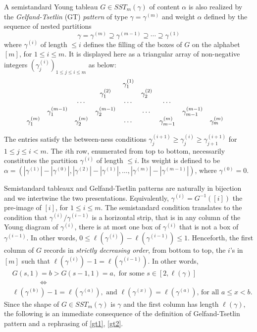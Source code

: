 \documentclass[reqno]{amsart}
\theoremstyle{tplain}
\begin{document}
{A semistandard Young tableau $G\in SST_m(\gamma)$ of content $\alpha$ is also realized by the \emph{Gelfand-Tsetlin} (GT) \emph{pattern} of type $\gamma=\gamma^{(m)}$ and weight $\alpha$ \cite{gt50} defined by the sequence of nested partitions
$$\gamma = \gamma^{(m)}\supseteq  \gamma^{(m-1)}\supseteq\cdots\supseteq \gamma^{(1)}$$
where $ \gamma^{(i)}$ of length $\le i$ defines  the filling of the boxes of $G$ on the alphabet $[m]$, for  $1\le i\le m$.
It is
displayed here as a triangular array of
non-negative integers $(\gamma_j^{(i)})_{1\leq j\leq i\leq m}$
as below:
\begin{equation}\label{gtpattern}
\begin{array}{cccccccccccccccccc}
&&&&\gamma_1^{(1)}\cr
&&&\gamma_1^{(2)}&&\gamma_2^{(2)}\cr
&&\cdots&&\cdots&&\cdots\cr
&\gamma_1^{(m-1)}&&\gamma_2^{(m-1)}&&\cdots&&\gamma_{m-1}^{(m-1)}\cr
\gamma_1^{(m)}&&\gamma_2^{(m)}&&\cdots&&\gamma_{m-1}^{(m)}&&\gamma_m^{(m)}&\cr
\end{array}
\end{equation}

The entries satisfy the between-ness conditions $\gamma_j^{(i+1)}\geq \gamma_j^{(i)}\geq \gamma_{j+1}^{(i+1)}$
for $1\leq j\leq i<m$. The $i$th row, enumerated from top to bottom, necessarily constitutes the partition $\gamma^{(i)}$
of length $\leq i$. Its weight is defined to be $\alpha=(|\gamma^{(1)}|-|\gamma^{(0)}|,|\gamma^{(2)}|-|\gamma^{(1)}|,\dots, |\gamma^{(m)}|-|\gamma^{(m-1)}|)$, where  $\gamma^{(0)}=0$.

Semistandard tableaux and Gelfand-Tsetlin patterns are naturally in bijection and we intertwine  the two presentations. Equivalently, $\gamma^{(i)}=G^{-1}([i])$ the pre-image of $[i]$, for $1\le i\le m$. The
semistandard condition translates to the condition that $ \gamma^{(i)}/\gamma^{(i-1 )}$ is a horizontal
strip, that is in any column of the Young diagram of $\gamma^{(i)}$, there is at most one box of
$\gamma^{(i)}$ that is not a box of $\gamma^{(i-1 )}$. In other words, $0\le \ell(\gamma^{(i)})-\ell(\gamma^{(i-1 )})\le 1$.
Henceforth, the first column of $G$ records in  \emph{strictly decreasing order}, from bottom to top, the $i$'s in $[m]$ such that  $\ell(\gamma^{(i)})-1=\ell(\gamma^{(i-1)})$. In other words,
\begin{align}&G(s,1)=b>G(s-1,1)=a, \mbox{ for some $s\in [2,\ell(\gamma)]$}\label{gt1}\\
&\qquad \qquad\Leftrightarrow \nonumber\\
&\ell(\gamma^{(b)})-1=\ell(\gamma^{(a)}), \mbox{ and  $\ell(\gamma^{(x)})=\ell(\gamma^{(a)})$, for all $a\le x<b$}.\label{gt2}
 \end{align}
  Since the shape of $G\in SST_m(\gamma)$ is $\gamma$ and the first column has length $\ell(\gamma)$, the following is an immediate  consequence of the  definition of Gelfand-Tsetlin pattern and  a rephrasing of \eqref{gt1}, \eqref{gt2}.

}
\end{document}
